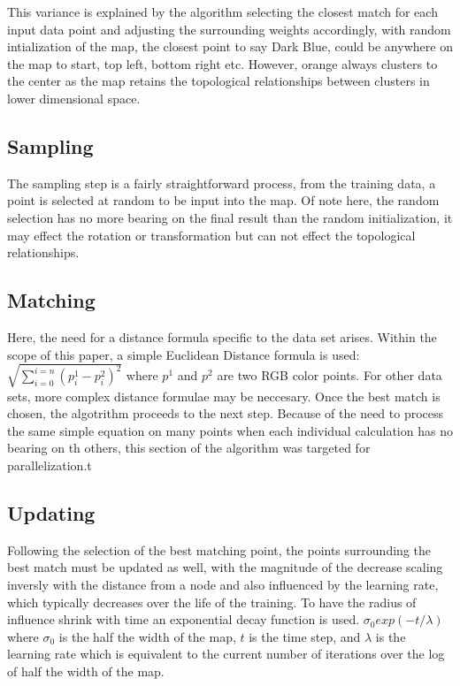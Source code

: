 \documentclass[11pt]{article}
\begin{document}
This variance is explained by the algorithm selecting the closest match for each input data point and adjusting the surrounding weights accordingly, with random intialization of the map, the closest point to say Dark Blue, could be anywhere on the map to start, top left, bottom right etc. However, orange always clusters to the center as the map retains the topological relationships between clusters in lower dimensional space.

\subsection{Sampling}

The sampling step is a fairly straightforward process, from the training data, a point is selected at random to be input into the map. Of note here, the random selection has no more bearing on the final result than the random initialization, it may effect the rotation or transformation but can not effect the topological relationships.

\subsection{Matching}

Here, the need for a distance formula specific to the data set arises. Within the scope of this paper, a simple Euclidean Distance formula is used: \begin{math}\sqrt{\sum\limits_{i=0}^{i=n} ({p^1_i}-{p^2_i})^2} \end{math}  where \(p^1\) and \(p^2\) are two RGB color points. For other data sets, more complex distance formulae may be neccesary. Once the best match is chosen, the algotrithm proceeds to the next step. Because of the need to process the same simple equation on many points when each individual calculation has no bearing on th others, this section of the algorithm was targeted for parallelization.t

\subsection{Updating}

Following the selection of the best matching point, the points surrounding the best match must be updated as well, with the magnitude of the decrease scaling inversly with the distance from a node and also influenced by the learning rate, which typically decreases over the life of the training. To have the radius of influence shrink with time an exponential decay function is used. \begin{math}\sigma_0exp(-t/\lambda) \end{math} where \(\sigma_0\) is the half the width of the map, \(t\) is the time step, and \(\lambda\) is the learning rate which is equivalent to the current number of iterations over the log of half the width of the map. 
\end{document}
